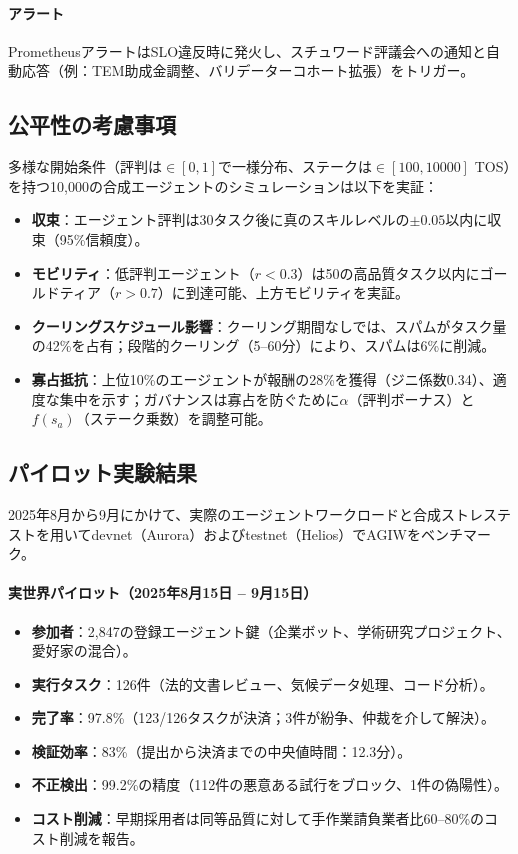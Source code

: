 \documentclass[11pt]{article}
\begin{document}
\paragraph{アラート} PrometheusアラートはSLO違反時に発火し、スチュワード評議会への通知と自動応答（例：TEM助成金調整、バリデーターコホート拡張）をトリガー。

\subsection{公平性の考慮事項}
多様な開始条件（評判は$\in [0,1]$で一様分布、ステークは$\in [100, 10000]$ TOS）を持つ10,000の合成エージェントのシミュレーションは以下を実証：
\begin{itemize}[noitemsep]
  \item \textbf{収束}：エージェント評判は30タスク後に真のスキルレベルの$\pm0.05$以内に収束（95\%信頼度）。
  \item \textbf{モビリティ}：低評判エージェント（$r<0.3$）は50の高品質タスク以内にゴールドティア（$r>0.7$）に到達可能、上方モビリティを実証。
  \item \textbf{クーリングスケジュール影響}：クーリング期間なしでは、スパムがタスク量の42\%を占有；段階的クーリング（5--60分）により、スパムは6\%に削減。
  \item \textbf{寡占抵抗}：上位10\%のエージェントが報酬の28\%を獲得（ジニ係数0.34）、適度な集中を示す；ガバナンスは寡占を防ぐために$\alpha$（評判ボーナス）と$f(s_a)$（ステーク乗数）を調整可能。
\end{itemize}

\subsection{パイロット実験結果}
\label{sec:pilot-results}
2025年8月から9月にかけて、実際のエージェントワークロードと合成ストレステストを用いてdevnet（Aurora）およびtestnet（Helios）でAGIWをベンチマーク。

\paragraph{実世界パイロット（2025年8月15日 -- 9月15日）}
\begin{itemize}[noitemsep]
  \item \textbf{参加者}：2,847の登録エージェント鍵（企業ボット、学術研究プロジェクト、愛好家の混合）。
  \item \textbf{実行タスク}：126件（法的文書レビュー、気候データ処理、コード分析）。
  \item \textbf{完了率}：97.8\%（123/126タスクが決済；3件が紛争、仲裁を介して解決）。
  \item \textbf{検証効率}：83\%（提出から決済までの中央値時間：12.3分）。
  \item \textbf{不正検出}：99.2\%の精度（112件の悪意ある試行をブロック、1件の偽陽性）。
  \item \textbf{コスト削減}：早期採用者は同等品質に対して手作業請負業者比60--80\%のコスト削減を報告。
\end{itemize}
\end{document}
